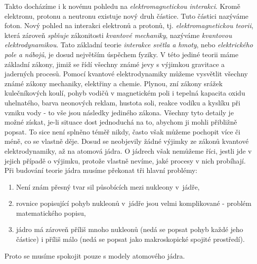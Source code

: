       Takto docházíme i k novému pohledu na \emph{elektromagnetickou interakci}. Kromě elektronu,
      protonu a neutronu existuje nový druh částice. Tuto částici nazýváme foton. Nový pohled na
      interakci elektronů a protonů, tj. \emph{elektromagnetickou teorii}, která zároveň
      \emph{splňuje} zákonitosti \emph{kvantové mechaniky}, nazýváme \emph{kvantovou
      elektrodynamikou}. Tato základní teorie \emph{interakce světla a hmoty}, nebo
      \emph{elektrického pole a nábojů}, je dosud největším úspěchem fyziky. V této jediné teorii
      máme základní zákony, jimiž se řídí všechny známé jevy s výjimkou gravitace a jaderných
      procesů. Pomocí kvantové elektrodynamiky můžeme vysvětlit všechny známé zákony mechaniky,
      elektřiny a chemie. Plynou, zní zákony srážek kulečníkových koulí, pohyb vodičů v magnetickém
      poli i tepelná kapacita oxidu uhelnatého, barva neonových reklam, hustota soli, reakce vodíku
      a kyslíku při vzniku vody - to vše jsou následky jediného zákona. Všechny tyto detaily je
      možné získat, je-li situace dost jednoduchá na to, abychom ji mohli přibližně popsat. To sice
      není splněno téměř nikdy, často však můžeme pochopit více či méně, co se vlastně děje. Dosud
      se neobjevily žádné výjimky ze zákonů kvantové elektrodynamiky, až na atomová jádra. O jádrech
      však nemůžeme říci, jestli jde v jejich případě o výjimku, protože vlastně nevíme, jaké
      procesy v nich probíhají. Při budování teorie jádra musíme překonat tři hlavní problémy:
      \begin{enumerate}[noitemsep]
      \item Není znám přesný tvar sil působících mezi nukleony v jádře,
      \item rovnice popisující pohyb nukleonů v jádře jsou velmi komplikované - problém  
            matematického popisu,
      \item jádro má zároveň příliš mnoho nukleonů (nedá se popsat pohyb každé jeho částice) i    
            příliš málo (nedá se popsat jako makroskopické spojité prostředí).   
      \end{enumerate}
      Proto se musíme spokojit pouze s modely atomového jádra. 
      
